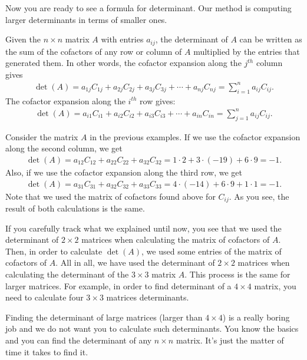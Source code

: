\documentclass{subfile}
\begin{document}
Now you are ready to see a formula for determinant. Our method is computing larger determinants in terms of smaller ones.

	\begin{definition}
		Given the $n\times n$ matrix $A$ with entries $a_{ij}$, the determinant of $A$ can be written as the sum of the cofactors of any row or column of $A$ multiplied by the entries that generated them. In other words, the cofactor expansion along the $j^{th}$ column gives
		\begin{align*}
		\det(A) = a_{1j}C_{1j} + a_{2j}C_{2j} + a_{3j}C_{3j} + \cdots + a_{nj}C_{nj} = \sum_{i=1}^{n} a_{ij} C_{ij}.
		\end{align*}
		The cofactor expansion along the $i^{th}$ row gives:
		\begin{align*}
		\det(A) = a_{i1}C_{i1} + a_{i2}C_{i2} + a_{i3}C_{i3} + \cdots + a_{in}C_{in} = \sum_{j=1}^{n} a_{ij} C_{ij}.
		\end{align*}
	\end{definition}
	
	\begin{example}
		Consider the matrix $A$ in the previous examples. If we use the cofactor expansion along the second column, we get
		\begin{align*}
			\det(A)=a_{12} C_{12} + a_{22}C_{22} + a_{32} C_{32} = 1 \cdot 2 + 3 \cdot (-19) + 6 \cdot 9 = -1. 
		\end{align*}
		Also, if we use the cofactor expansion along the third row, we get
		\begin{align*}
		\det(A)=a_{31} C_{31} + a_{32}C_{32} + a_{33} C_{33} = 4 \cdot (-14) + 6 \cdot 9 + 1 \cdot 1 = -1. 
		\end{align*}
		Note that we used the matrix of cofactors found above for $C_{ij}$. As you see, the result of both calculations is the same.
	\end{example}

If you carefully track what we explained until now, you see that we used the determinant of $2\times 2$ matrices when calculating the matrix of cofactors of $A$. Then, in order to calculate $\det(A)$, we used some entries of the matrix of cofactors of $A$. All in all, we have used the determinant of $2\times 2$ matrices when calculating the determinant of the $3 \times 3$ matrix $A$. This process is the same for larger matrices. For example, in order to find determinant of a $4 \times 4$ matrix, you need to calculate four $3\times 3$ matrices determinants.

Finding the determinant of large matrices (larger than $4 \times 4$) is a really boring job and we do not want you to calculate such determinants. You know the basics and you can find the determinant of any $n\times n$ matrix. It's just the matter of time it takes to find it.
\end{document}
